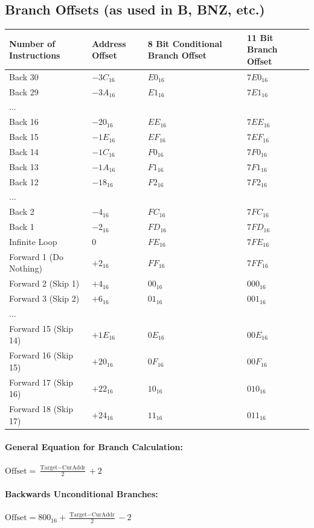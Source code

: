 \documentclass[12pt]{article}
\begin{document}
\subsection{Branch Offsets (as used in B, BNZ, etc.)}
\begin{tabular}{p{} p{} p{} p{}}
Number of Instructions & Address Offset & 8 Bit Conditional Branch Offset & 11 Bit Branch Offset\\
\hline
Back 30 & $-3C_{16}$ & $E0_{16}$ & $7E0_{16}$ \\
Back 29 & $-3A_{16}$ & $E1_{16}$ & $7E1_{16}$ \\
...\\
Back 16 & $-20_{16}$ & $EE_{16}$ & $7EE_{16}$ \\
Back 15 & $-1E_{16}$ & $EF_{16}$ & $7EF_{16}$ \\
Back 14 & $-1C_{16}$ & $F0_{16}$ & $7F0_{16}$ \\
Back 13 & $-1A_{16}$ & $F1_{16}$ & $7F1_{16}$ \\
Back 12 & $-18_{16}$ & $F2_{16}$ & $7F2_{16}$ \\
...\\
Back 2 & $-4_{16}$ & $FC_{16}$ & $7FC_{16}$ \\
Back 1 & $-2_{16}$ & $FD_{16}$ & $7FD_{16}$ \\
Infinite Loop & $0$ & $FE_{16}$ & $7FE_{16}$ \\
Forward 1 (Do Nothing) & $+2_{16}$ & $FF_{16}$ & $7FF_{16}$ \\
Forward 2 (Skip 1) & $+4_{16}$ & $00_{16}$ & $000_{16}$ \\
Forward 3 (Skip 2) & $+6_{16}$ & $01_{16}$ & $001_{16}$ \\
...\\
Forward 15 (Skip 14) & $+1E_{16}$ & $0E_{16}$ & $00E_{16}$ \\
Forward 16 (Skip 15) & $+20_{16}$ & $0F_{16}$ & $00F_{16}$ \\
Forward 17 (Skip 16) & $+22_{16}$ & $10_{16}$ & $010_{16}$ \\
Forward 18 (Skip 17) & $+24_{16}$ & $11_{16}$ & $011_{16}$
\end{tabular}

\paragraph{General Equation for Branch Calculation:}
\( \text{Offset} = \frac{\text{Target} - \text{CurAddr}}{2} + 2 \)

\paragraph{Backwards Unconditional Branches:}
\( \text{Offset} = 800_{16} + \frac{\text{Target} - \text{CurAddr}}{2} - 2 \)
\end{document}
